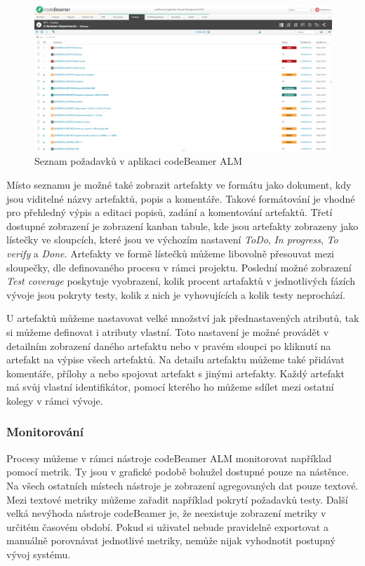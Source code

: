 \documentclass[czech,master,public,dept460,male,cpdeclaration,oneside]{diploma}
\begin{document}
\begin{figure}[!ht]
    \centering
    \includegraphics[width=1\textwidth]{Diplomka/Figures/codebeamer_requirments.png}
    \caption{Seznam požadavků v aplikaci codeBeamer ALM}
    \label{fig:codebeamer_requirments}
\end{figure}

Místo seznamu je možné také zobrazit artefakty ve formátu jako dokument, kdy jsou viditelné názvy artefaktů, popis a komentáře. Takové formátování je vhodné pro přehledný výpis a editaci popisů, zadání a komentování artefaktů. Třetí dostupné zobrazení je zobrazení kanban tabule, kde jsou artefakty zobrazeny jako lístečky ve sloupcích, které jsou ve výchozím nastavení \textit{ToDo}, \textit{In progress}, \textit{To verify} a \textit{Done}. Artefakty ve formě lístečků můžeme libovolně přesouvat mezi sloupečky, dle definovaného procesu v rámci projektu. Poslední možné zobrazení \textit{Test coverage} poskytuje vyobrazení, kolik procent artafaktů v jednotlivých fázích vývoje jsou pokryty testy, kolik z nich je vyhovujících a kolik testy neprochází. 

U artefaktů můžeme nastavovat velké množství jak přednastavených atributů, tak si můžeme definovat i atributy vlastní. Toto nastavení je možné provádět v detailním zobrazení daného artefaktu nebo v pravém sloupci po kliknutí na artefakt na výpise všech artefaktů. Na detailu artefaktu můžeme také přidávat komentáře, přílohy a nebo spojovat artefakt s jinými artefakty. Každý artefakt má svůj vlastní identifikátor, pomocí kterého ho můžeme sdílet mezi ostatní kolegy v rámci vývoje. 

\subsubsection{Monitorování}
Procesy můžeme v rámci nástroje codeBeamer ALM monitorovat například pomocí metrik. Ty jsou v grafické podobě bohužel dostupné pouze na nástěnce. Na všech ostatních místech nástroje je zobrazení agregovaných dat pouze textové. Mezi textové metriky můžeme zařadit například pokrytí požadavků testy. Další velká nevýhoda nástroje codeBeamer je, že neexistuje zobrazení metriky v určitém časovém období. Pokud si uživatel nebude pravidelně exportovat a manuálně porovnávat jednotlivé metriky, nemůže nijak vyhodnotit postupný vývoj systému. 
\end{document}
